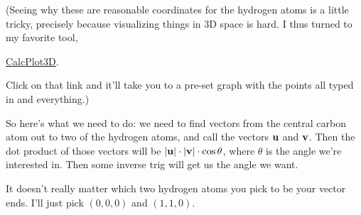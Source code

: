 \begin{enumerate}[leftmargin=0pt]
    \begin{red}
    (Seeing why these are reasonable coordinates for the hydrogen atoms is a little tricky, precisely because visualizing things in 3D space is hard. I thus turned to my favorite tool, \end{red} \href{https://c3d.libretexts.org/CalcPlot3D/index.html?type=point;point=(1/2,1/2,1/2);visible=true;color=rgb(255,0,0);size=4&type=point;point=(0,0,0);visible=true;color=rgb(17,109,192);size=6&type=point;point=(1,1,0);visible=true;color=rgb(17,109,192);size=6&type=point;point=(1,0,1);visible=true;color=rgb(17,109,192);size=6&type=point;point=(0,1,1);visible=true;color=rgb(17,109,192);size=6&type=window;hsrmode=3;nomidpts=false;anaglyph=-1;center=3.0188813072265694,9.378882675117357,5.056037826737073,1;focus=1,1,1,1;up=0.17012619465221945,-0.4273100550319643,0.8879545003893696,1;transparent=false;alpha=140;twoviews=false;unlinkviews=false;axisextension=0.7;xaxislabel=x;yaxislabel=y;zaxislabel=z;edgeson=true;faceson=true;showbox=true;showaxes=true;showticks=true;perspective=true;centerxpercent=0.5;centerypercent=0.5;rotationsteps=30;autospin=true;xygrid=false;yzgrid=false;xzgrid=false;gridsonbox=true;gridplanes=false;gridcolor=rgb(128,128,128);xmin=0;xmax=2;ymin=0;ymax=2;zmin=0;zmax=2;xscale=1;yscale=1;zscale=1;zcmin=-2;zcmax=4;zoom=1.773333;xscalefactor=1;yscalefactor=1;zscalefactor=1}{CalcPlot3D}.
    \begin{red} Click on that link and it'll take you to a pre-set graph with the points all typed in and everything.)
    
    So here's what we need to do: we need to find vectors from the central carbon atom out to two of the hydrogen atoms, and call the vectors $\mathbf{u}$ and $\mathbf{v}$. Then the dot product of those vectors will be $|\mathbf{u}|\cdot|\mathbf{v}|\cdot\cos\theta$, where $\theta$ is the angle we're interested in. Then some inverse trig will get us the angle we want.
    
    It doesn't really matter which two hydrogen atoms you pick to be your vector ends. I'll just pick $(0,0,0)$ and $(1, 1, 0)$. 
    

\end{red}
\end{enumerate}
